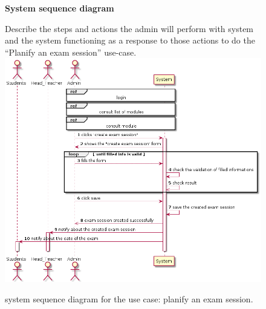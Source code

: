 \documentclass[]{uc2pfecaneva}
\begin{document}
    \begin{figure}
        \raggedright\textbf{System sequence diagram}\linebreak
        \raggedright{Describe the steps and actions the admin will perform with system and the system functioning
        as a response to those actions to do the “Planify an exam session” use-case.}
        \linebreak
        \includegraphics[width=\textwidth]{images/create_exam_session}

        \caption{system sequence diagram for the use case: planify an exam session.}
    \end{figure}
    \clearpage
\end{document}
